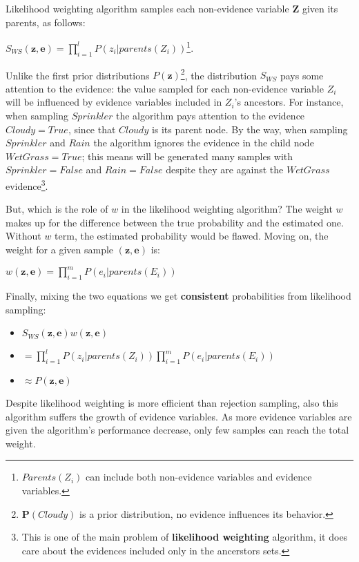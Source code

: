 Likelihood weighting algorithm samples each non-evidence variable $\mathbf{Z}$ given its parents, as follows:
\begin{center}
    $S_{WS}(\mathbf{z}, \mathbf{e})=\prod_{i=1}^{l}P(z_i|parents(Z_i))$\footnote{$Parents(Z_i)$ can include both non-evidence variables and evidence variables.}.
\end{center} \vspace{3.5pt}

Unlike the first prior distributions $P(\mathbf{z})$\footnote{$\mathbf{P}(Cloudy)$ is a prior distribution, no evidence influences its behavior.}, the distribution 
$S_{WS}$ pays some attention to the evidence: the value sampled for each non-evidence variable $Z_i$ will be influenced by evidence variables included in $Z_i$'s ancestors.
For instance, when sampling $Sprinkler$ the algorithm pays attention to the evidence $Cloudy = True$, since that $Cloudy$ is its parent node. By the way, when sampling
$Sprinkler$ and $Rain$ the algorithm ignores the evidence in the child node $WetGrass = True$; this means will be generated many samples with $Sprinkler = False$ and $Rain = False$
despite they are against the $WetGrass$ evidence\footnote{This is one of the main problem of \textbf{likelihood weighting} algorithm, it does care about the evidences included only in the ancerstors sets.}. \vspace{3.5pt}

But, which is the role of $w$ in the likelihood weighting algorithm? The weight $w$ makes up for the difference between the true probability and the estimated one.
Without $w$ term, the estimated probability would be flawed. Moving on, the weight for a given sample $(\mathbf{z}, \mathbf{e})$ is: \vspace{3.5pt}
\begin{center}
    $w(\mathbf{z}, \mathbf{e}) = \prod_{i=1}^{m}P(e_i|parents(E_i))$ 
\end{center} \vspace{3.5pt}
Finally, mixing the two equations we get \textbf{consistent} probabilities from likelihood sampling:
\begin{itemize}
    \renewcommand{\labelitemi}{}
    \item $S_{WS}(\mathbf{z}, \mathbf{e})w(\mathbf{z}, \mathbf{e})$
    \item $= \prod_{i=1}^{l}P(z_i|parents(Z_i))\prod_{i=1}^{m}P(e_i|parents(E_i))$
    \item $\approx P(\mathbf{z}, \mathbf{e})$
\end{itemize}

Despite likelihood weighting is more efficient than rejection sampling, also this algorithm suffers the growth of evidence variables. As more evidence variables are given 
the algorithm's performance decrease, only few samples can reach the total weight.